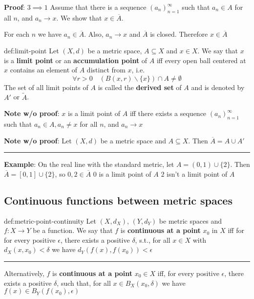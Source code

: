 \documentclass{article}
\begin{document}
\textbf{Proof}: $3\implies 1$
Assume that there is a sequence $(a_{n})^{\infty}_{n=1}$ such that $a_{n}\in A$ for all $n$, and $a_{n}\to x$. We show that $x\in \overline{A}$.

For each $n$ we have $a_{n}\in \overline{A}$. Also, $a_{n}\to x$ and $\overline{A}$ is closed. Therefore $x\in \overline{A}$

\begin{dfn}{def:limit-point}{}
    Let $(X, d)$ be a metric space, $A \subseteq X$ and $x\in X$. We say that $x$ is a \textbf{limit point} or an \textbf{accumulation point} of $A$ iff every open ball centered at $x$ contains an element of $A$ distinct from $x$, i.e.
    \[\forall r > 0 \quad (B(x,r) \backslash \{x\}) \cap A \ne \emptyset\]
    The set of all limit points of $A$ is called the \textbf{derived set} of $A$ and is denoted by $A'$ or $\tilde{A}$.
\end{dfn}

\textbf{Note w/o proof}: $x$ is a limit point of $A$ iff there exists a sequence $(a_{n})^{\infty}_{n=1}$ such that $a_{n}\in A, a_{n} \ne x$ for all $n$, and $a_{n}\to x$

\textbf{Note w/o proof}: Let $(X, d)$ be a metric space and $A \subseteq X$. Then $\overline{A} = A \cup A'$

\noindent\rule{\textwidth}{0.2pt}
\textbf{Example}: On the real line with the standard metric, let $A = (0,1) \cup \{2\}$. Then $\overline{A} = [0,1]\cup \{2\}$, so $0,2\in \overline{A}$
$0$ is a limit point of $A$
$2$ isn't a limit point of $A$

\newpage
\subsection{Continuous functions between metric spaces}

\begin{dfn}{def:metric-point-continuity}{}
    Let $(X, d_{X}),\, (Y,d_{Y})$ be metric spaces and $f: X \to Y $ be a function. We say that $f$ is \textbf{continuous at a point} $x_{0}$ in $X$ iff for for every positive $\epsilon$, there exists a positive $\delta$, s.t., for all $x\in X$ with $d_{X}(x,x_{0}) < \delta$ we have $d_{Y}(f(x), f(x_{0})) < \epsilon$
    
    \noindent\rule{\textwidth}{0.2pt}
    Alternatively, $f$ is \textbf{continuous at a point} $x_{0}\in X$ iff, for every positive $\epsilon$, there exists a positive $\delta$, such that, for all $x\in B_{X}(x_{0}, \delta)$ we have $f(x)\in B_{Y}(f(x_{0}), \epsilon)$
\end{dfn}
\end{document}
